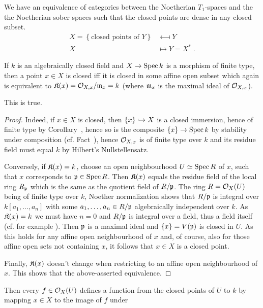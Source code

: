 \documentclass[a4paper,parskip=half,numbers=enddot, DIV=12]{scrreprt}
\begin{document}
\begin{fact}
    We have an equivalence of categories between the Noetherian $T_1$-spaces and the the Noetherian sober spaces such that the closed points are dense in any closed subset. 
    \begin{align*}
        X =\left\{\text{closed points of } Y\right\} &\longmapsfrom Y\\
        X&\longmapsto Y= X^*\;.
    \end{align*}
\end{fact}
If $k$ is an algebraically closed field and $X\morphism \Spec k$ is a morphism of finite type, then a point $x\in X$ is closed iff it is closed in some affine open subset which again is equivalent to $\mathfrak{K}(x)=\mathcal{O}_{X,x}/\mathfrak{m}_x = k$ (where $\mathfrak{m}_x$ is the maximal ideal of $\mathcal{O}_{X,x}$). 
\begin{claim*}
	This is true.
\end{claim*}
\begin{proof}
	Indeed, if $x\in X$ is closed, then $\{x\}\monomorphism X$ is a closed immersion, hence of finite type by Corollary~, hence so is the composite $\{x\}\morphism\Spec k$ by stability under composition (cf. Fact~), hence $\mathcal{O}_{X,x}$ is of finite type over $k$ and its residue field must equal $k$ by Hilbert's Nullstellensatz.
	
	Conversely, if $\mathfrak{K}(x)=k$, choose an open neighbourhood $U\simeq \operatorname{Spec} R$ of $x$, such that $x$ corresponds to $\mathfrak{p}\in\operatorname{Spec} R$. Then $\mathfrak{K}(x)$ equals the residue field of the local ring $R_{\mathfrak{p}}$ which is the same as the quotient field of $R/\mathfrak{p}$. The ring $R=\mathcal{O}_X(U)$ being of finite type over $k$, Noether normalization  shows that $R/\mathfrak{p}$ is integral over $k[a_1,\ldots,a_n]$ with some $a_1,\ldots,a_n\in R/\mathfrak{p}$ algebraically independent over $k$. As $\mathfrak{K}(x)=k$ we must have $n=0$ and $R/\mathfrak{p}$ is integral over a field, thus a field itself (cf. for example \cite[Proposition~1.5.1]{alg1}). Then $\mathfrak{p}$ is a maximal ideal and $\{x\}=V(\mathfrak{p})$ is closed in $U$. As this holds for any affine open neighbourhood of $x$ and, of course, also for those affine open sets not containing $x$, it follows that $x\in X$ is a closed point.
	
	Finally, $\mathfrak{K}(x)$ doesn't change when restricting to an affine open neighbourhood of $x$. This shows that the above-asserted equivalence.
\end{proof}
Then every $f\in \mathcal{O}_X(U)$ defines a function from the closed points of $U$ to $k$ by mapping $x\in X$ to the image of $f$ under
\end{document}
